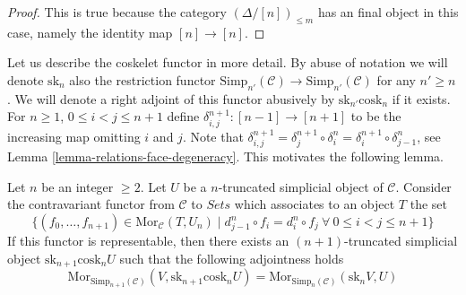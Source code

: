 \begin{proof}
This is true because the category $(\Delta/[n])_{\leq m}$
has an final object in this case, namely the identity
map $[n] \to [n]$.
\end{proof}

\noindent
Let us describe the coskelet functor in more detail.
By abuse of notation we will denote $\text{sk}_n$
also the restriction functor
$\text{Simp}_{n'}(\mathcal{C}) \to \text{Simp}_{n'}(\mathcal{C})$
for any $n' \geq n$. We will denote a right adjoint
of this functor abusively by $\text{sk}_{n'}\text{cosk}_n$
if it exists.
For $n \geq 1$, $0 \leq i < j \leq n + 1$
define $\delta^{n + 1}_{i,j} : [n - 1] \to [n + 1]$
to be the increasing map omitting $i$ and $j$.
Note that
$\delta^{n + 1}_{i,j} =
\delta^{n + 1}_j \circ \delta^n_i =
\delta^{n + 1}_i \circ \delta^n_{j - 1}$, see
Lemma \ref{lemma-relations-face-degeneracy}. This motivates
the following lemma.

\begin{lemma}
\label{lemma-work-out}
Let $n$ be an integer $\geq 2$. Let $U$ be a $n$-truncated
simplicial object of $\mathcal{C}$. Consider the
contravariant functor from $\mathcal{C}$ to $\textit{Sets}$
which associates to an object $T$ the set
$$
\{ (f_0,\ldots,f_{n + 1}) \in \text{Mor}_{\mathcal{C}}(T, U_n)
\mid
d^n_{j - 1} \circ f_i = d^n_i \circ f_j\ 
\forall\ 0\leq i < j\leq n + 1\}
$$
If this functor is representable, then there exists an
$(n + 1)$-truncated simplicial object
$\text{sk}_{n + 1}\text{cosk}_n U$ such that the following
adjointness holds
$$
\text{Mor}_{\text{Simp}_{n + 1}(\mathcal{C})}(V,
\text{sk}_{n + 1}\text{cosk}_n U)
=
\text{Mor}_{\text{Simp}_n(\mathcal{C})}(\text{sk}_nV, U)
$$
\end{lemma}


